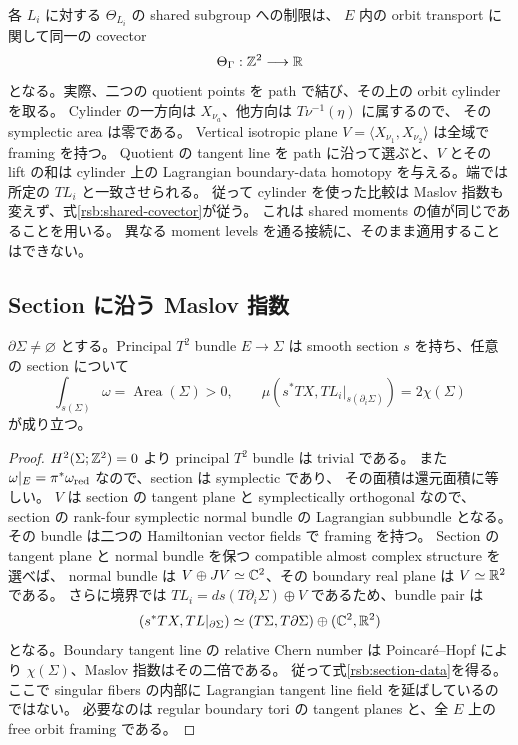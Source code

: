 各 $L_i$ に対する $\Theta_{L_i}$ の shared subgroup への制限は、
$E$ 内の orbit transport に関して同一の covector
\begin{equation}\label{rsb:shared-covector}
 \Theta_\Gamma:\mathbb Z^2\longrightarrow\mathbb R
\end{equation}
となる。実際、二つの quotient points を path で結び、その上の orbit cylinder を取る。
Cylinder の一方向は $X_{\nu_a}$、他方向は $T\nu^{-1}(\eta)$ に属するので、
その symplectic area は零である。
Vertical isotropic plane $V=\langle X_{\nu_1},X_{\nu_2}\rangle$ は全域で framing を持つ。
Quotient の tangent line を path に沿って選ぶと、$V$ とその lift の和は cylinder 上の
Lagrangian boundary-data homotopy を与える。端では所定の $TL_i$ と一致させられる。
従って cylinder を使った比較は Maslov 指数も変えず、式\eqref{rsb:shared-covector}が従う。
これは shared moments の値が同じであることを用いる。
異なる moment levels を通る接続に、そのまま適用することはできない。

\subsection{Section に沿う Maslov 指数}

\begin{lemma}[自由な二つの作用を持つ還元曲面]\label{rsb:maslov-section}
$\partial\Sigma\ne\varnothing$ とする。Principal $T^2$ bundle $E\to\Sigma$ は
smooth section $s$ を持ち、任意の section について
\begin{equation}\label{rsb:section-data}
 \int_{s(\Sigma)}\omega=\operatorname{Area}(\Sigma)>0,
 \qquad
 \mu(s^*TX,TL_i|_{s(\partial_i\Sigma)})=2\chi(\Sigma)
\end{equation}
が成り立つ。
\end{lemma}

\begin{proof}
$H^2(\Sigma;\mathbb Z^2)=0$ より principal $T^2$ bundle は trivial である。
また $\omega|_E=\pi^*\omega_{\rm red}$ なので、section は symplectic であり、
その面積は還元面積に等しい。
$V$ は section の tangent plane と symplectically orthogonal なので、
section の rank-four symplectic normal bundle の Lagrangian subbundle となる。
その bundle は二つの Hamiltonian vector fields で framing を持つ。
Section の tangent plane と normal bundle を保つ compatible almost complex structure を選べば、
normal bundle は $V\oplus JV\simeq\mathbb C^2$、その boundary real plane は $V\simeq\mathbb R^2$ である。
さらに境界では $TL_i=ds(T\partial_i\Sigma)\oplus V$ であるため、bundle pair は
\[
 (s^*TX,TL|_{\partial\Sigma})
 \simeq (T\Sigma,T\partial\Sigma)\oplus(\mathbb C^2,\mathbb R^2)
\]
となる。Boundary tangent line の relative Chern number は Poincar\'e--Hopf により
$\chi(\Sigma)$、Maslov 指数はその二倍である。
従って式\eqref{rsb:section-data}を得る。
ここで singular fibers の内部に Lagrangian tangent line field を延ばしているのではない。
必要なのは regular boundary tori の tangent planes と、全 $E$ 上の free orbit framing である。
\end{proof}

